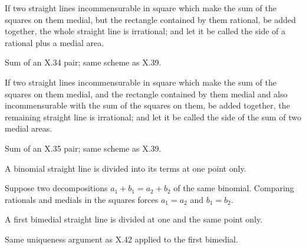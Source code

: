 \documentclass{rrxiv}
\begin{document}
\begin{claim}
\label{prop:X.40}
If two straight lines incommensurable in square which make the sum
of the squares on them medial, but the rectangle contained by them
rational, be added together, the whole straight line is irrational;
and let it be called the side of a rational plus a medial area.
\end{claim}
\begin{evidence}[Proof of X.40]
\label{ev:X.40}
Sum of an X.34 pair; same scheme as X.39.
\end{evidence}

\begin{claim}
\label{prop:X.41}
If two straight lines incommensurable in square which make the sum
of the squares on them medial, and the rectangle contained by them
medial and also incommensurable with the sum of the squares on them,
be added together, the remaining straight line is irrational; and
let it be called the side of the sum of two medial areas.
\end{claim}
\begin{evidence}[Proof of X.41]
\label{ev:X.41}
Sum of an X.35 pair; same scheme as X.39.
\end{evidence}

\begin{claim}
\label{prop:X.42}
A binomial straight line is divided into its terms at one point only.
\end{claim}
\begin{evidence}[Proof of X.42]
\label{ev:X.42}
Suppose two decompositions $a_1 + b_1 = a_2 + b_2$ of the same
binomial.  Comparing rationals and medials in the squares forces
$a_1 = a_2$ and $b_1 = b_2$.
\end{evidence}

\begin{claim}
\label{prop:X.43}
A first bimedial straight line is divided at one and the same point
only.
\end{claim}
\begin{evidence}[Proof of X.43]
\label{ev:X.43}
Same uniqueness argument as X.42 applied to the first bimedial.
\end{evidence}
\end{document}
